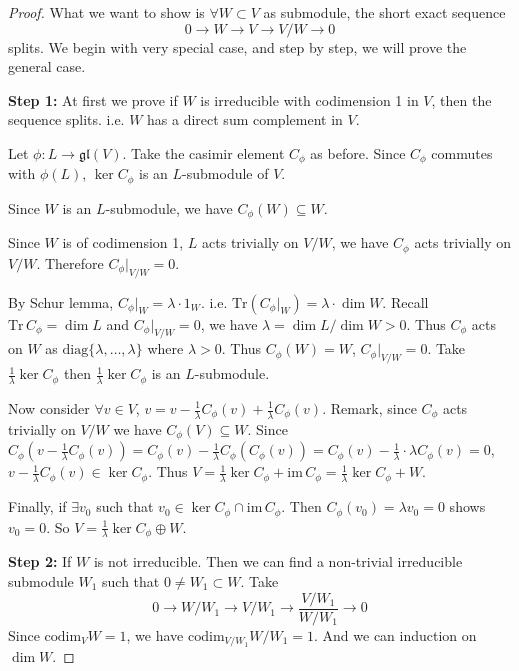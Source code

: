 \begin{proof}
    What we want to show is $\forall W \subset V$ as submodule, the short exact sequence
    \[
        0 \longrightarrow W \longrightarrow V \longrightarrow V/W \longrightarrow 0
    \]
    splits. We begin with very special case, and step by step, we will prove the general case.

    \vspace{1em}
    \noindent \textbf{Step 1:} At first we prove if $W$ is irreducible with codimension 1 in $V$, then the sequence splits. i.e. $W$ has a direct sum complement in $V$.

    Let $\phi : L \to \mathfrak{gl}(V)$. Take the casimir element $C_\phi$ as before. Since $C_\phi$ commutes with $\phi(L)$, $\ker C_\phi$ is an $L$-submodule of $V$.

    Since $W$ is an $L$-submodule, we have $C_\phi(W) \subseteq W$.

    Since $W$ is of codimension 1, $L$ acts trivially on $V/W$, we have $C_\phi$ acts trivially on $V/W$. Therefore $C_\phi|_{V/W} = 0$.

    By Schur lemma, $C_\phi|_W = \lambda \cdot 1_W$. i.e. $\mathrm{Tr}(C_\phi|_W) = \lambda \cdot \dim W$. Recall $\mathrm{Tr}\, C_\phi = \dim L$ and $C_\phi|_{V/W} = 0$, we have $\lambda = \dim L / \dim W > 0$. Thus $C_\phi$ acts on $W$ as $\mathrm{diag}\{\lambda, \dots, \lambda\}$ where $\lambda > 0$. Thus $C_\phi(W) = W$, $C_\phi|_{V/W} = 0$. Take $\frac{1}{\lambda} \ker C_\phi$ then $\frac{1}{\lambda} \ker C_\phi$ is an $L$-submodule.

    Now consider $\forall v \in V$, $v = v - \frac{1}{\lambda}C_\phi(v) + \frac{1}{\lambda}C_\phi(v)$. Remark, since $C_\phi$ acts trivially on $V/W$ we have $C_\phi(V) \subseteq W$. Since $C_\phi\left(v - \frac{1}{\lambda}C_\phi(v)\right) = C_\phi(v) - \frac{1}{\lambda}C_\phi(C_\phi(v)) = C_\phi(v) - \frac{1}{\lambda} \cdot \lambda C_\phi(v) = 0$, $v - \frac{1}{\lambda}C_\phi(v) \in \ker C_\phi$. Thus $V = \frac{1}{\lambda}\ker C_\phi + \mathrm{im}\, C_\phi = \frac{1}{\lambda}\ker C_\phi + W$.

    Finally, if $\exists v_0$ such that $v_0 \in \ker C_\phi \cap \mathrm{im}\, C_\phi$. Then $C_\phi(v_0) = \lambda v_0 = 0$ shows $v_0 = 0$. So $V = \frac{1}{\lambda}\ker C_\phi \oplus W$.

    \vspace{1em}
    \noindent \textbf{Step 2:} If $W$ is not irreducible. Then we can find a non-trivial irreducible submodule $W_1$ such that $0 \neq W_1 \subset W$. Take
    \[
        0 \longrightarrow W/W_1 \longrightarrow V/W_1 \longrightarrow \frac{V/W_1}{W/W_1} \longrightarrow 0
    \]
    Since $\mathrm{codim}_V W = 1$, we have $\mathrm{codim}_{V/W_1} W/W_1 = 1$. And we can induction on $\dim W$.


\end{proof}
